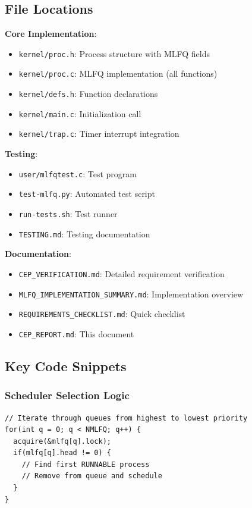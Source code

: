 \documentclass[11pt,a4paper]{article}
\begin{document}
\subsection{File Locations}

\textbf{Core Implementation}:
\begin{itemize}
    \item \texttt{kernel/proc.h}: Process structure with MLFQ fields
    \item \texttt{kernel/proc.c}: MLFQ implementation (all functions)
    \item \texttt{kernel/defs.h}: Function declarations
    \item \texttt{kernel/main.c}: Initialization call
    \item \texttt{kernel/trap.c}: Timer interrupt integration
\end{itemize}

\textbf{Testing}:
\begin{itemize}
    \item \texttt{user/mlfqtest.c}: Test program
    \item \texttt{test-mlfq.py}: Automated test script
    \item \texttt{run-tests.sh}: Test runner
    \item \texttt{TESTING.md}: Testing documentation
\end{itemize}

\textbf{Documentation}:
\begin{itemize}
    \item \texttt{CEP\_VERIFICATION.md}: Detailed requirement verification
    \item \texttt{MLFQ\_IMPLEMENTATION\_SUMMARY.md}: Implementation overview
    \item \texttt{REQUIREMENTS\_CHECKLIST.md}: Quick checklist
    \item \texttt{CEP\_REPORT.md}: This document
\end{itemize}

\subsection{Key Code Snippets}

\subsubsection{Scheduler Selection Logic}
\begin{lstlisting}
// Iterate through queues from highest to lowest priority
for(int q = 0; q < NMLFQ; q++) {
  acquire(&mlfq[q].lock);
  if(mlfq[q].head != 0) {
    // Find first RUNNABLE process
    // Remove from queue and schedule
  }
}
\end{lstlisting}
\end{document}
